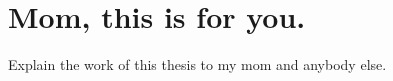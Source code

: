 \chapter{Mom, this is for you.\label{ch:mom}}

Explain the work of this thesis to my mom and anybody else.

